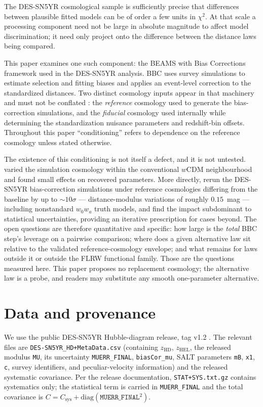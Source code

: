 \documentclass[11pt]{article}
\begin{document}
The DES-SN5YR cosmological sample \citep{DES2024,Vincenzi2024,Sanchez2024}
is sufficiently precise that differences between plausible fitted models
can be of order a few units in $\chi^2$. At that scale a processing
component need not be large in absolute magnitude to affect model
discrimination; it need only project onto the difference between the
distance laws being compared.

This paper examines one such component: the BEAMS with Bias Corrections
framework \citep{KesslerScolnic2017} used in the DES-SN5YR analysis. BBC
uses survey simulations to estimate selection and fitting biases and
applies an event-level correction to the standardized distances. Two
distinct cosmology inputs appear in that machinery and must not be
conflated \citep{Camilleri2024}: the \emph{reference} cosmology used to
generate the bias-correction simulations, and the \emph{fiducial}
cosmology used internally while determining the standardization nuisance
parameters and redshift-bin offsets. Throughout this paper
``conditioning'' refers to dependence on the reference cosmology unless
stated otherwise.

The existence of this conditioning is not itself a defect, and it is not
untested. \citet{KesslerScolnic2017} varied the simulation cosmology
within the conventional $w$CDM neighbourhood and found small effects on
recovered parameters. More directly, \citet{Camilleri2024} rerun the
DES-SN5YR bias-correction simulations under reference cosmologies
differing from the baseline by up to $\sim 10\sigma$ --- distance-modulus
variations of roughly $0.15$~mag --- including nonstandard $w_0 w_a$
truth models, and find the impact subdominant to statistical
uncertainties, providing an iterative prescription for cases beyond. The
open questions are therefore quantitative and specific: how large is the
\emph{total} BBC step's leverage on a pairwise comparison; where does a
given alternative law sit relative to the validated reference-cosmology
envelope; and what remains for laws outside it or outside the FLRW
functional family. Those are the questions measured here. This paper
proposes no replacement cosmology; the alternative law is a probe, and
readers may substitute any smooth one-parameter alternative.

\section{Data and provenance}
\label{sec:data}

We use the public DES-SN5YR Hubble-diagram release, tag v1.2
\citep{DES2024,Sanchez2024}. The relevant files are
\texttt{DES-SN5YR\_HD+MetaData.csv} (containing $z_{\mathrm{HD}}$,
$z_{\mathrm{HEL}}$, the released modulus \texttt{MU}, its uncertainty
\texttt{MUERR\_FINAL}, \texttt{biasCor\_mu}, SALT parameters \texttt{mB},
\texttt{x1}, \texttt{c}, survey identifiers, and peculiar-velocity
information) and the released systematic covariance. Per the release
documentation, \texttt{STAT+SYS.txt.gz} contains systematics only; the
statistical term is carried in \texttt{MUERR\_FINAL} and the total
covariance is $C = C_{\mathrm{sys}} +
\mathrm{diag}(\texttt{MUERR\_FINAL}^2)$.
\end{document}
